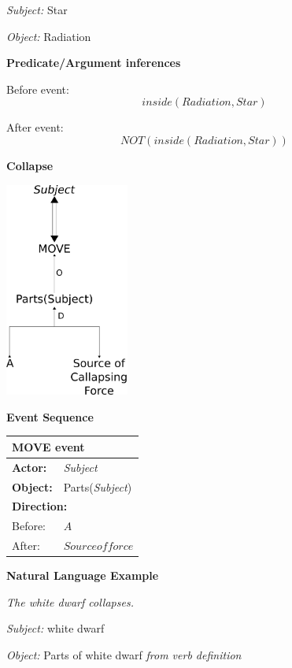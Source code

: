 \documentclass[../dissertation]{subfiles}
\begin{document}
\textit{Subject:} Star

\textit{Object:} Radiation

\bigskip
\textbf{Predicate/Argument inferences}

Before event:
\[inside(Radiation, Star)\]

After event:
\[NOT(inside(Radiation, Star))\]

\newpage

\textbf{Collapse}
\begin{center}
	\includegraphics[height=200pt]{collapse-cd.png}
\end{center}
	\bigskip
    
\textbf{Event Sequence}
\begin{center}
    \begin{tabular}{l l}
      \toprule
      \multicolumn{2}{l}{\textbf{MOVE event}}\\
      \hline
      \textbf{Actor:} & \textit{Subject}\\
      \textbf{Object:} & Parts(\textit{Subject})\\
      
      \multicolumn{2}{l}{\textbf{Direction:}} \\
      Before: & \(A\) \\
      After: & \(Source of force\) \\
      \bottomrule
    \end{tabular}
    
\end{center}

\textbf{Natural Language Example}

\textit{The white dwarf collapses.}

\textit{Subject:} white dwarf

\textit{Object:} Parts of white dwarf \textit{from verb definition}
\end{document}
